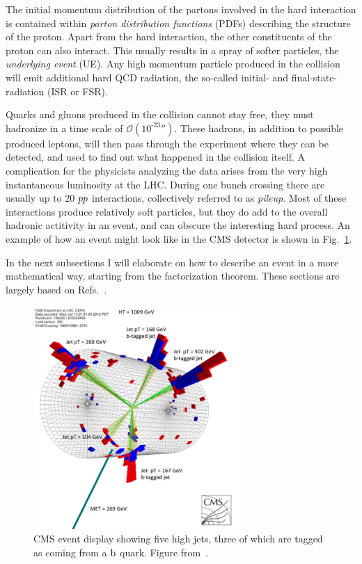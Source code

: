 The initial momentum distribution of the partons involved in the hard interaction is contained
within \textit{parton distribution functions} (PDFs) describing the structure of the proton. 
Apart from the hard interaction, the other constituents of the proton can also interact. This
usually results in a spray of softer particles, the \textit{underlying event} (UE). 
Any high momentum particle produced in the collision will emit additional hard QCD radiation, the
so-called initial- and final-state-radiation (ISR or FSR).

Quarks and gluons produced in the collision cannot stay free, they must hadronize in a time scale
of $\mathcal{O}(\text{10}^{\text{-23}}\second)$. These hadrons, in addition to possible produced
leptons, will then pass through the experiment where they can be detected, and used to find out
what happened in the collision itself. 
A complication for the physicists analyzing the data arises from the very high
instantaneous luminosity at the LHC. During one bunch crossing there are usually up to 20
${p}{p}$ interactions, collectively referred to as \textit{pileup}. Most of these interactions
produce relatively soft particles, but they do add to the overall hadronic actitivity in an event,
and can obscure the interesting hard process. 
An example of how an event might look like in the CMS detector is shown in
Fig.~\ref{fig:event_display}. 

In the next subsections I will elaborate on how to describe an event in a more mathematical way,
starting from the factorization theorem. These sections are largely based on
Refs.~\cite{Campbell:2006wx,Skands:2011pf,Salam_Bautzen,Tung:2001cv}.

\begin{figure}[htpb]
  \centering
  \includegraphics[width=0.7\textwidth]{figures/eventreco_event/event_display_SUS12024}
  \caption{CMS event display showing five high \pt jets, three of which are tagged as coming from a
$\mathrm{b}$ quark. Figure from~\cite{SUS12024_event_display}.
  \label{fig:event_display}}
\end{figure}


